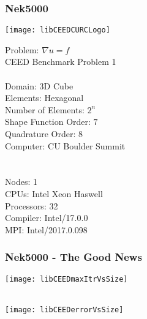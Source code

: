 \documentclass{beamer}
\begin{document}
\begin{frame}
\begin{center}
\frametitle{Nek5000}

\texttt{[image: libCEEDCURCLogo]}

\begin{flushleft}

\begin{multicols}{2}

Problem: $\nabla u = f$\\

\hspace{2mm} CEED Benchmark Problem 1\\

~\\

Domain: 3D Cube\\

Elements: Hexagonal\\

Number of Elements: $2^n$\\

Shape Function Order: $7$\\

Quadrature Order: $8$\\

Computer: CU Boulder Summit\\

~\\

~\\

Nodes: 1\\

CPUs: Intel Xeon Haswell\\

Processors: 32\\

Compiler: Intel/17.0.0\\

MPI: Intel/2017.0.098

\end{multicols}

\end{flushleft}

\end{center}
\end{frame}


\begin{frame}
\begin{center}
\frametitle{Nek5000 - The Good News}

\begin{multicols}{2}

\texttt{[image: libCEEDmaxItrVsSize]}

~\\

\texttt{[image: libCEEDerrorVsSize]}

\end{multicols}

\end{center}
\end{frame}
\end{document}
